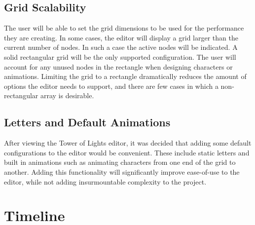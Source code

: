 \documentclass[12pt]{article}
\begin{document}
  	\subsection{Grid Scalability}
    	The user will be able to set the grid dimensions to be used for the performance they are creating. In some cases, the editor will display a grid larger than the current number of nodes. In such a case the active nodes will be indicated. A solid rectangular grid will be the only supported configuration. The user will account for any unused nodes in the rectangle when designing characters or animations. Limiting the grid to a rectangle dramatically reduces the amount of options the editor needs to support, and there are few cases in which a non-rectangular array is desirable.
      
  	\subsection{Letters and Default Animations}
    	After viewing the Tower of Lights editor, it was decided that adding some default configurations to the editor would be convenient. These include static letters and built in animations such as animating characters from one end of the grid to another. Adding this functionality will significantly improve ease-of-use to the editor, while not adding insurmountable complexity to the project. 
      
\newpage
	\section{Timeline}
\end{document}
